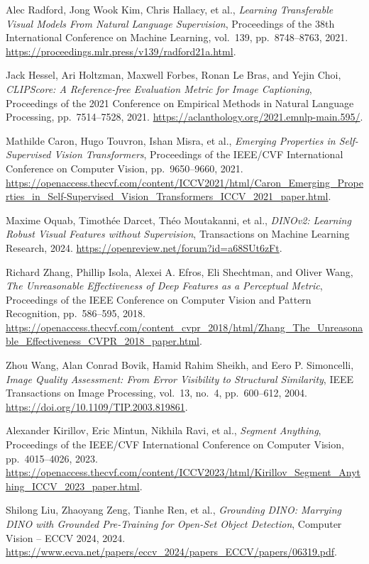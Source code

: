 Alec Radford, Jong Wook Kim, Chris Hallacy, et al.,
\textit{Learning Transferable Visual Models From Natural Language Supervision},
Proceedings of the 38th International Conference on Machine Learning, vol.~139, pp.~8748--8763, 2021.
\url{https://proceedings.mlr.press/v139/radford21a.html}.

Jack Hessel, Ari Holtzman, Maxwell Forbes, Ronan Le Bras, and Yejin Choi,
\textit{CLIPScore: A Reference-free Evaluation Metric for Image Captioning},
Proceedings of the 2021 Conference on Empirical Methods in Natural Language Processing, pp.~7514--7528, 2021.
\url{https://aclanthology.org/2021.emnlp-main.595/}.

Mathilde Caron, Hugo Touvron, Ishan Misra, et al.,
\textit{Emerging Properties in Self-Supervised Vision Transformers},
Proceedings of the IEEE/CVF International Conference on Computer Vision, pp.~9650--9660, 2021.
\url{https://openaccess.thecvf.com/content/ICCV2021/html/Caron_Emerging_Properties_in_Self-Supervised_Vision_Transformers_ICCV_2021_paper.html}.

Maxime Oquab, Timoth\'ee Darcet, Th\'eo Moutakanni, et al.,
\textit{DINOv2: Learning Robust Visual Features without Supervision},
Transactions on Machine Learning Research, 2024.
\url{https://openreview.net/forum?id=a68SUt6zFt}.

Richard Zhang, Phillip Isola, Alexei A. Efros, Eli Shechtman, and Oliver Wang,
\textit{The Unreasonable Effectiveness of Deep Features as a Perceptual Metric},
Proceedings of the IEEE Conference on Computer Vision and Pattern Recognition, pp.~586--595, 2018.
\url{https://openaccess.thecvf.com/content_cvpr_2018/html/Zhang_The_Unreasonable_Effectiveness_CVPR_2018_paper.html}.

Zhou Wang, Alan Conrad Bovik, Hamid Rahim Sheikh, and Eero P. Simoncelli,
\textit{Image Quality Assessment: From Error Visibility to Structural Similarity},
IEEE Transactions on Image Processing, vol.~13, no.~4, pp.~600--612, 2004.
\url{https://doi.org/10.1109/TIP.2003.819861}.

Alexander Kirillov, Eric Mintun, Nikhila Ravi, et al.,
\textit{Segment Anything},
Proceedings of the IEEE/CVF International Conference on Computer Vision, pp.~4015--4026, 2023.
\url{https://openaccess.thecvf.com/content/ICCV2023/html/Kirillov_Segment_Anything_ICCV_2023_paper.html}.

Shilong Liu, Zhaoyang Zeng, Tianhe Ren, et al.,
\textit{Grounding DINO: Marrying DINO with Grounded Pre-Training for Open-Set Object Detection},
Computer Vision -- ECCV 2024, 2024.
\url{https://www.ecva.net/papers/eccv_2024/papers_ECCV/papers/06319.pdf}.
